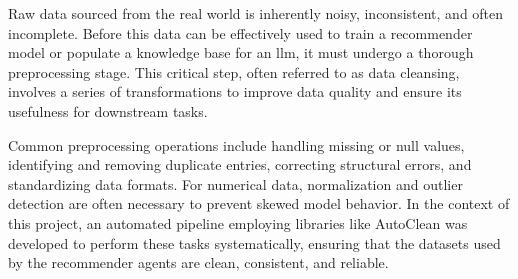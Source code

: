 Raw data sourced from the real world is inherently noisy, inconsistent, and often incomplete. Before this data can be effectively used to train a recommender model or populate a knowledge base for an \ac{llm}, it must undergo a thorough preprocessing stage. This critical step, often referred to as data cleansing, involves a series of transformations to improve data quality and ensure its usefulness for downstream tasks.

Common preprocessing operations include handling missing or null values, identifying and removing duplicate entries, correcting structural errors, and standardizing data formats. For numerical data, normalization and outlier detection are often necessary to prevent skewed model behavior. In the context of this project, an automated pipeline employing libraries like AutoClean \cite{AUTOCLEAN} was developed to perform these tasks systematically, ensuring that the datasets used by the recommender agents are clean, consistent, and reliable.